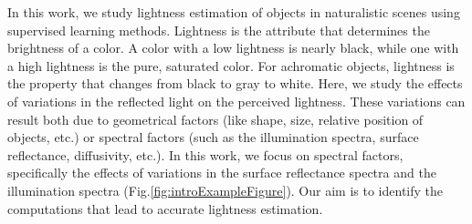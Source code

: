 \documentclass{jov}
\begin{document}
In this work, we study lightness estimation of objects in naturalistic scenes using supervised learning methods. Lightness is the attribute that determines the brightness of a color. A color with a low lightness is nearly black, while one with a high lightness is the pure, saturated color. For achromatic objects, lightness is the property that changes from black to gray to white. Here, we study the effects of variations in the reflected light on the perceived lightness. These variations can result both due to geometrical factors (like shape, size, relative position of objects, etc.) or  spectral factors (such as the illumination spectra, surface reflectance, diffusivity, etc.). In this work, we focus on spectral factors, specifically the effects of variations in the surface reflectance spectra and the illumination spectra (Fig.\ref{fig:introExampleFigure}). Our aim is to identify the computations that lead to accurate lightness estimation.

\end{document}
